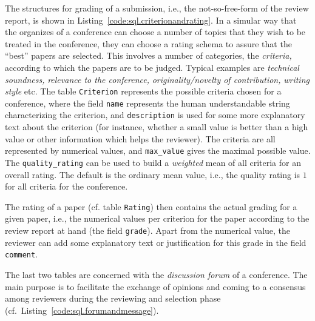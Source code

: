 The structures for grading of a submission, i.e., the not-so-free-form of
the review report, is shown in Listing~\ref{code:sql.criterionandrating}.
In a simular way that the organizes of a conference can choose a number of
topics that they wish to be treated in the conference, they can choose a
rating schema to assure that the ``best'' papers are selected.
%
This involves a number of categories, the \emph{criteria,} according to
which the papers are to be judged. Typical examples are \emph{technical
  soundness,} \emph{relevance to the conference,} \emph{originality/novelty
  of contribution,} \emph{writing style} etc. The table \texttt{Criterion}
represents the possible criteria chosen for a conference, where the field
\texttt{name} represents the human understandable string characterizing the
criterion, and \texttt{description} is used for some more explanatory text
about the criterion (for instance, whether a small value is better than a
high value or other information which helps the reviewer). The criteria are
all represented by numerical values, and \texttt{max\_value} gives the
maximal possible value. The \texttt{quality\_rating} can be used to build
a \emph{weighted} mean of all criteria for an overall rating. The default
is the ordinary mean value, i.e., the quality rating is $1$ for all
criteria for the conference. 

The rating of a paper (cf. table \texttt{Rating}) then contains the actual
grading for a given paper, i.e., the numerical values per criterion for the
paper according to the review report at hand (the field \texttt{grade}).
Apart from the numerical value, the reviewer can add some explanatory text
or justification for this grade in the field \texttt{comment}.


%


\medskip

The last two tables are concerned with the \emph{discussion forum} of a
conference. The main purpose is to facilitate the exchange of opinions and
coming to a consensus among reviewers during the reviewing and selection
phase (cf.\ Listing~\ref{code:sql.forumandmessage}).

%


%



